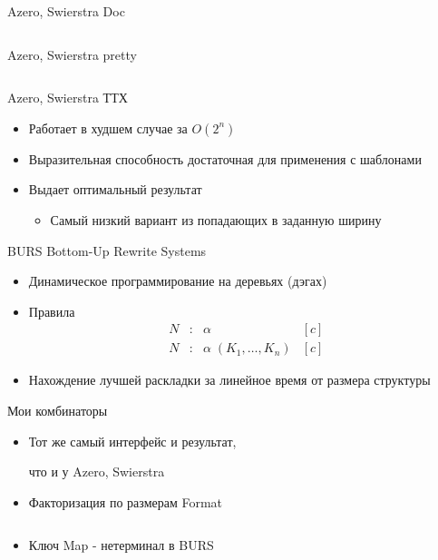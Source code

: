 \documentclass[sans]{beamer}
\begin{document}
\begin{frame}{Azero, Swierstra Doc}
  \inputminted{hs}{codes/swierstraDoc.hs}
\end{frame}

\begin{frame}{Azero, Swierstra pretty}
  \inputminted{hs}{codes/swierstraPretty.hs}
\end{frame}

\begin{frame}{Azero, Swierstra ТТХ}
  \begin{itemize}
    \item Работает в худшем случае за $O(2 ^ n)$
    \item Выразительная способность достаточная для применения с шаблонами 
    \item Выдает оптимальный результат
    \begin{itemize}
      \item Самый низкий вариант из попадающих в заданную ширину
    \end{itemize}
  \end{itemize}
\end{frame}

\begin{frame}{BURS}
  Bottom-Up Rewrite Systems

  \begin{itemize}
    \item Динамическое программирование на деревьях (дэгах)
    \item Правила
    $$
    \begin{array}{rcll}

      N &:& \alpha& [c]\\
      N &:& \alpha\; (K_1,\dots,K_n)& [c]
    \end{array}
    $$
    \item Нахождение лучшей раскладки за линейное время от размера структуры
  \end{itemize}

\end{frame}

\begin{frame}{Мои комбинаторы}
  \begin{itemize}
    \item Тот же самый интерфейс и результат,
      
      что и у Azero, Swierstra
    \item Факторизация по размерам Format
      \inputminted{hs}{codes/myCombFS.hs}
    \item Ключ Map - нетерминал в BURS
  \end{itemize}
\end{frame}
\end{document}
